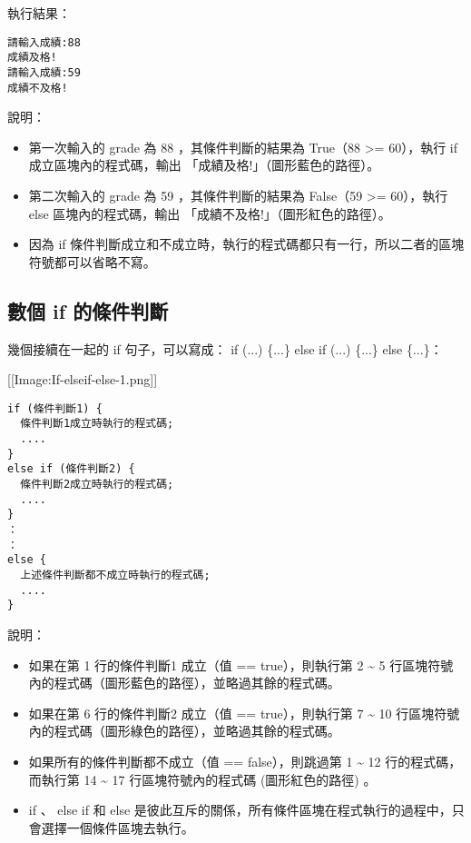 \documentclass[a4paper,12pt,english]{sphinxmanual}
\begin{document}
執行結果：

\begin{Verbatim}[commandchars=@\[\]]
請輸入成績:88
成績及格!
請輸入成績:59
成績不及格!
\end{Verbatim}

說明：
\begin{itemize}
\item {} 
第一次輸入的 grade 為 88 ，其條件判斷的結果為 True（88 \textgreater{}= 60），執行 if 成立區塊內的程式碼，輸出 「成績及格!」（圖形藍色的路徑）。

\item {} 
第二次輸入的 grade 為 59 ，其條件判斷的結果為 False（59 \textgreater{}= 60），執行 else 區塊內的程式碼，輸出 「成績不及格!」（圖形紅色的路徑）。

\item {} 
因為 if 條件判斷成立和不成立時，執行的程式碼都只有一行，所以二者的區塊符號都可以省略不寫。

\end{itemize}


\subsection{數個 if 的條件判斷}
\label{java_cond:id5}
幾個接續在一起的 if 句子，可以寫成： if (...) \{...\} else if (...) \{...\} else \{...\}：

{[}{[}Image:If-elseif-else-1.png{]}{]}

\begin{Verbatim}[commandchars=@\[\]]
if (條件判斷1) {
  條件判斷1成立時執行的程式碼;
  ....
}
else if (條件判斷2) {
  條件判斷2成立時執行的程式碼;
  ....
}
：
：
else {
  上述條件判斷都不成立時執行的程式碼;
  ....
}
\end{Verbatim}

說明：
\begin{itemize}
\item {} 
如果在第 1 行的條件判斷1 成立（值 == true），則執行第 2 \textasciitilde{} 5 行區塊符號內的程式碼（圖形藍色的路徑），並略過其餘的程式碼。

\item {} 
如果在第 6 行的條件判斷2 成立（值 == true），則執行第 7 \textasciitilde{} 10 行區塊符號內的程式碼（圖形綠色的路徑），並略過其餘的程式碼。

\item {} 
如果所有的條件判斷都不成立（值 == false），則跳過第 1 \textasciitilde{} 12 行的程式碼，而執行第 14 \textasciitilde{} 17 行區塊符號內的程式碼 (圖形紅色的路徑) 。

\item {} 
if 、 else if 和 else 是彼此互斥的關係，所有條件區塊在程式執行的過程中，只會選擇一個條件區塊去執行。

\end{itemize}
\end{document}

